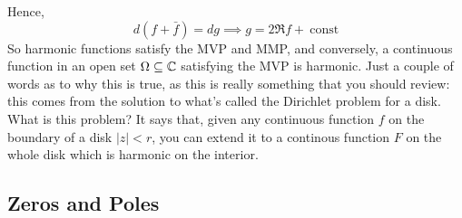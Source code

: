 \documentclass{article}
\begin{document}
Hence,
\begin{equation}d(f + \bar{f}) = dg \implies g = 2\Re f + \ \text{const}\end{equation}
So harmonic functions satisfy the MVP and MMP, and conversely, a continuous function in an open set \(\Omega \subseteq \mathbb{C}\) satisfying the MVP is harmonic. Just a couple of words as to why this is true, as this is really something that you should review: this comes from the solution to what's called the Dirichlet problem for a disk. What is this problem? It says that, given any continuous function \(f\) on the boundary of a disk \(|z| < r\), you can extend it to a continous function \(F\) on the whole disk which is harmonic on the interior.

\subsection{Zeros and Poles}
\end{document}
